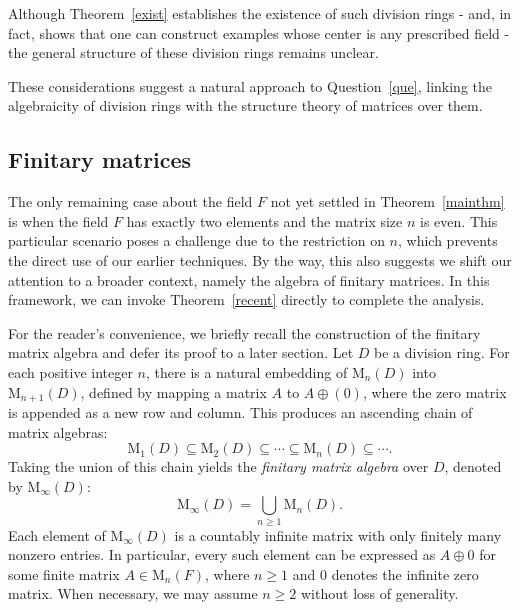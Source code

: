 \documentclass[11pt]{article}
\theoremstyle{definition}
\begin{document}
{{{{			
			Although Theorem~\ref{exist} establishes the existence of such division rings - and, in fact, shows that one can construct examples whose center is any prescribed field - the general structure of these division rings remains unclear.
			

			
			These considerations suggest a natural approach to Question~\ref{que}, linking the algebraicity of division rings with the structure theory of matrices over them.
				
				
				
				

				
				
				\subsection{Finitary matrices}
				
				The only remaining case about the field $F$ not yet settled in Theorem~\ref{mainthm} is when the field $F$ has exactly two elements and the matrix size $n$ is even. This particular scenario poses a challenge due to the restriction on  $n$, which prevents the direct use of our earlier techniques. By the way, this also suggests we shift our attention to a broader context, namely the algebra of finitary matrices. In this framework, we can invoke Theorem~\ref{recent} directly to complete the analysis.
				
				For the reader's convenience, we briefly recall the construction of the finitary matrix algebra and defer its proof to a later section. Let $D$ be a division ring. For each positive integer $n$, there is a natural embedding of $\mathrm{M}_n(D)$ into $\mathrm{M}_{n+1}(D)$, defined by mapping a matrix $A$ to $A \oplus (0)$, where the zero matrix is appended as a new row and column. This produces an ascending chain of matrix algebras:
				\[
				\mathrm{M}_1(D) \subseteq \mathrm{M}_2(D) \subseteq \cdots \subseteq \mathrm{M}_n(D) \subseteq \cdots.
				\]
				Taking the union of this chain yields the \emph{finitary matrix algebra} over $D$, denoted by $\mathrm{M}_\infty(D)$:
				\[
				\mathrm{M}_\infty(D) = \bigcup_{n \geq 1} \mathrm{M}_n(D).
				\]
				Each element of $\mathrm{M}_\infty(D)$ is a countably infinite matrix with only finitely many nonzero entries. In particular, every such element can be expressed as $A \oplus 0$ for some finite matrix $A \in \mathrm{M}_n(F)$, where $n \geq 1$ and $0$ denotes the infinite zero matrix. When necessary, we may assume $n \geq 2$ without loss of generality.
				
}}}}
\end{document}
